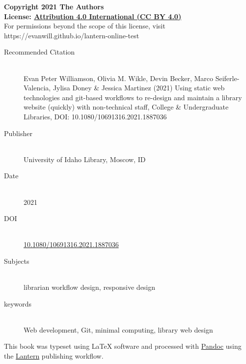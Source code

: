 \documentclass{book}
\newcommand{\booklicense}{\href{https://creativecommons.org/licenses/by/4.0/}{Attribution
4.0 International (CC BY 4.0)}}
\begin{document}
\begin{flushleft}

\textbf{Copyright \textcopyright{} 2021  The Authors\\
License: \booklicense}\\[11pt] 


For permissions beyond the scope of this license, visit https://evanwill.github.io/lantern-online-test

\vspace*{\fill}

\begin{description}
  \item[Recommended Citation] \hfill \\ Evan Peter Williamson, Olivia M.
Wikle, Devin Becker, Marco Seiferle-Valencia, Jylisa Doney \& Jessica Martinez
(2021) Using static web technologies and git-based workflows to re-design and
maintain a library website (quickly) with non-technical staff, College \&
Undergraduate Libraries, DOI: 10.1080/10691316.2021.1887036
  \item[Publisher] \hfill \\ University of Idaho Library, Moscow, ID
  \item[Date] \hfill \\ 2021
          \item[DOI] \hfill \\ \href{https://doi.org/10.1080/10691316.2021.1887036}{10.1080/10691316.2021.1887036}
    \item[Subjects] \hfill \\ librarian workflow design, responsive design
  \item[keywords] \hfill \\ Web development, Git, minimal computing, library
web design
  
\end{description}


\vspace*{\fill}

This book was typeset using \LaTeX{} software and processed with \href{https://pandoc.org}{Pandoc} using the \href{http://lantern.northwestern.pub}{Lantern} publishing workflow.\\

\end{flushleft}

\addtocounter{page}{2}
\end{document}
